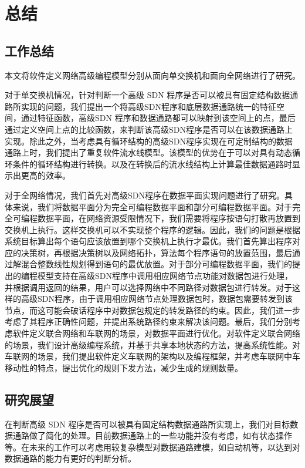 \chapter{总结}

\section{工作总结}

本文将软件定义网络高级编程模型分别从面向单交换机和面向全网络进行了研究。

对于单交换机情况，针对判断一个高级 SDN 程序是否可以被具有固定结构数据通路所实现的问题，我们提出一个将高级SDN程序和底层数据通路统一的特征空间，通过特征函数，高级SDN 程序和数据通路都可以映射到该空间上的点，最后通过定义空间上点的比较函数，来判断该高级SDN程序是否可以在该数据通路上实现。除此之外，当考虑具有循环结构的高级SDN程序实现在可定制结构的数据通路上时，我们提出了重复软件流水线模型。该模型的优势在于可以对具有动态循环条件的循环结构进行转换。以及在转换后的流水线结构上计算最佳数据通路时显示出更高的效率。

对于全网络情况，我们首先对高级SDN程序在数据平面实现问题进行了研究。具体来说，我们将数据平面分为完全可编程数据平面和部分可编程数据平面。对于完全可编程数据平面，在网络资源受限情况下，我们需要将程序按语句打散再放置到交换机上执行。这样交换机可以不实现整个程序的逻辑。因此，我们的问题是根据系统目标算出每个语句应该放置到哪个交换机上执行才最优。我们首先算出程序对应的决策树，再根据决策树以及网络拓扑，算法每个程序语句的放置范围，最后通过解混合整数线性规划得到语句的最优放置。对于部分可编程数据平面，我们的提出的编程模型支持在高级SDN程序中调用相应网络节点功能对数据包进行处理，并根据调用返回的结果，用户可以选择网络中不同路径对数据包进行转发。对于这样的高级SDN程序，由于调用相应网络节点处理数据包时，数据包需要转发到该节点，而这可能会破话程序中对数据包规定的转发路径的约束。因此，我们进一步考虑了其程序正确性问题，并提出系统路径约束来解决该问题。最后，我们分别考虑软件定义联合网络和车联网的场景，对数据平面进行优化。对软件定义联合网络的场景，我们设计高级编程系统，并基于共享本地状态的方法，提高系统性能。对车联网的场景，我们提出软件定义车联网的架构以及编程框架，并考虑车联网中车移动性的特点，提出优化的规则下发方法，减少生成的规则数量。


\section{研究展望}

在判断高级 SDN 程序是否可以被具有固定结构数据通路所实现上，我们对目标数据通路做了简化的处理。目前数据通路上的一些功能并没有考虑，如有状态操作等。在未来的工作可以考虑用较复杂模型对数据通路建模，如自动机等，以达到对数据通路的能力有更好的判断分析。

